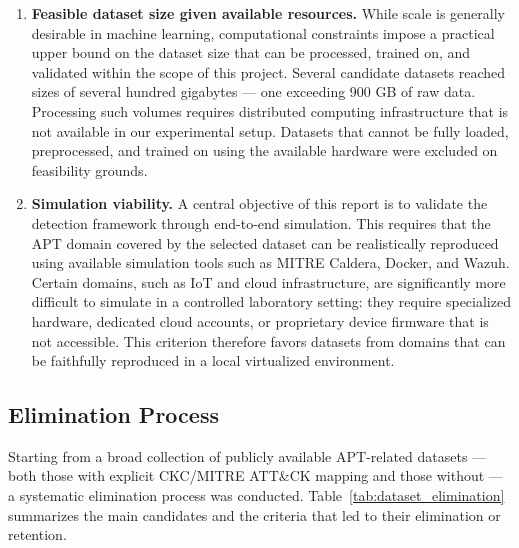 \begin{enumerate}
    \item \textbf{Feasible dataset size given available resources.}
    While scale is generally desirable in machine learning, computational constraints
    impose a practical upper bound on the dataset size that can be processed, trained
    on, and validated within the scope of this project. Several candidate datasets
    reached sizes of several hundred gigabytes --- one exceeding 900 GB of raw data.
    Processing such volumes requires distributed computing infrastructure that is not
    available in our experimental setup. Datasets that cannot be fully loaded,
    preprocessed, and trained on using the available hardware were excluded on
    feasibility grounds.

    \item \textbf{Simulation viability.}
    A central objective of this report is to validate the detection framework through
    end-to-end simulation. This requires that the APT domain covered by the selected
    dataset can be realistically reproduced using available simulation tools such as
    MITRE Caldera, Docker, and Wazuh. Certain domains, such as IoT and cloud
    infrastructure, are significantly more difficult to simulate in a controlled
    laboratory setting: they require specialized hardware, dedicated cloud accounts,
    or proprietary device firmware that is not accessible. This criterion therefore
    favors datasets from domains that can be faithfully reproduced in a local
    virtualized environment.

\end{enumerate}

\subsection{Elimination Process}

Starting from a broad collection of publicly available APT-related datasets --- both
those with explicit CKC/MITRE ATT\&CK mapping and those without --- a systematic
elimination process was conducted. Table~\ref{tab:dataset_elimination} summarizes
the main candidates and the criteria that led to their elimination or retention.


